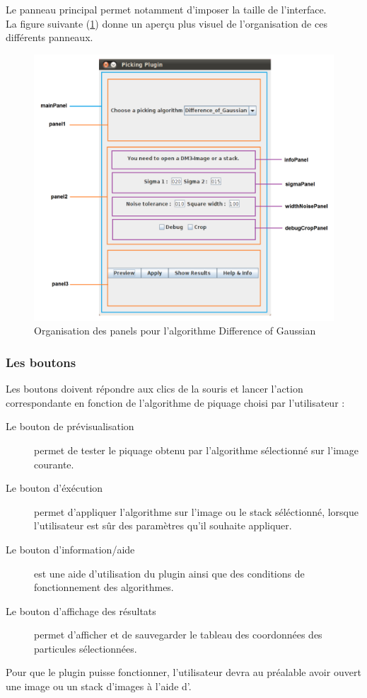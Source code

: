 Le panneau principal permet notamment d'imposer la taille de l'interface.\\
La figure suivante (\ref{panneaux}) donne un aperçu plus visuel de l'organisation de ces différents panneaux.
\begin{figure}[!h] 
\includegraphics[width=1\textwidth]{plugin3-1.png}
\caption{Organisation des panels pour l'algorithme Difference of Gaussian}
\label{panneaux}
\end{figure}
\pagebreak
\subsubsection{Les boutons}

Les boutons doivent répondre aux clics de la souris et lancer l'action correspondante en fonction de l'algorithme de piquage choisi par l'utilisateur :

\begin{description}
\item [Le bouton de prévisualisation] permet de tester le piquage obtenu par l'algorithme sélectionné sur l'image courante.
\item [Le bouton d'éxécution] permet d'appliquer l'algorithme sur l'image ou le stack séléctionné, lorsque l'utilisateur est s\^ur des paramètres qu'il souhaite appliquer.
\item [Le bouton d'information/aide] est une aide d'utilisation du plugin ainsi que des conditions de fonctionnement des algorithmes.
\item [Le bouton d'affichage des résultats] permet d'afficher et de sauvegarder le tableau des coordonnées des particules sélectionnées.%
\end{description}
Pour que le plugin puisse fonctionner, l'utilisateur devra au préalable avoir ouvert une image ou un stack d'images à l'aide d'\imj.
\pagebreak
